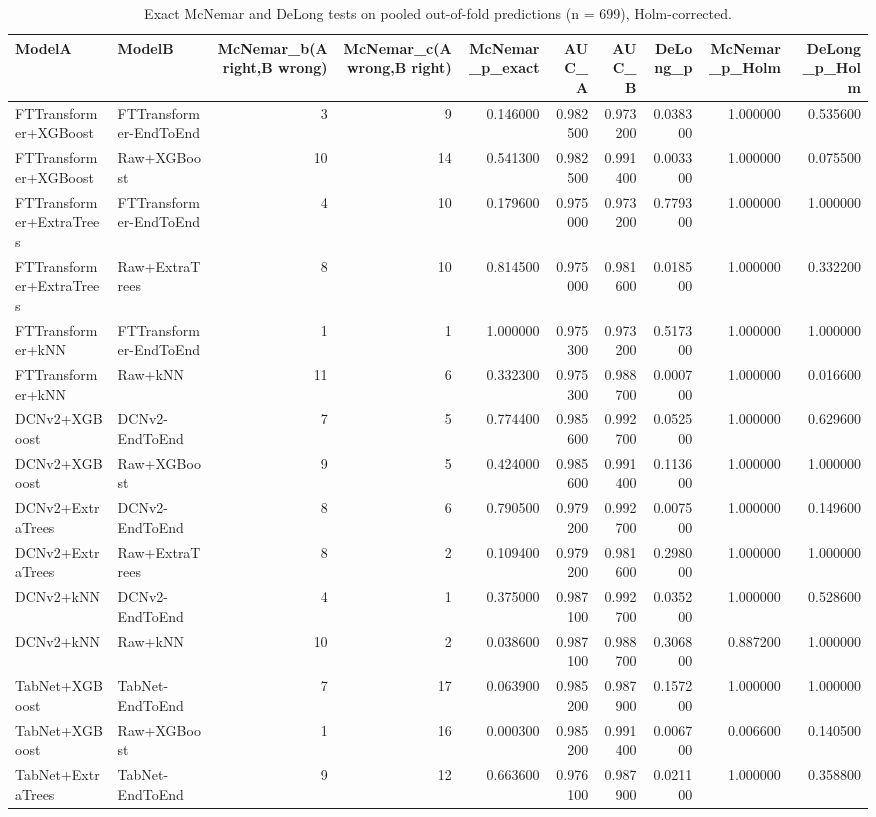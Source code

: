 \begin{table}
\caption{Exact McNemar and DeLong tests on pooled out-of-fold predictions (n = 699), Holm-corrected.}
\label{tab:stats}
\begin{tabular}{llrrrrrrrr}
\toprule
ModelA & ModelB & McNemar\_b(A right,B wrong) & McNemar\_c(A wrong,B right) & McNemar\_p\_exact & AUC\_A & AUC\_B & DeLong\_p & McNemar\_p\_Holm & DeLong\_p\_Holm \\
\midrule
FTTransformer+XGBoost & FTTransformer-EndToEnd & 3 & 9 & 0.146000 & 0.982500 & 0.973200 & 0.038300 & 1.000000 & 0.535600 \\
FTTransformer+XGBoost & Raw+XGBoost & 10 & 14 & 0.541300 & 0.982500 & 0.991400 & 0.003300 & 1.000000 & 0.075500 \\
FTTransformer+ExtraTrees & FTTransformer-EndToEnd & 4 & 10 & 0.179600 & 0.975000 & 0.973200 & 0.779300 & 1.000000 & 1.000000 \\
FTTransformer+ExtraTrees & Raw+ExtraTrees & 8 & 10 & 0.814500 & 0.975000 & 0.981600 & 0.018500 & 1.000000 & 0.332200 \\
FTTransformer+kNN & FTTransformer-EndToEnd & 1 & 1 & 1.000000 & 0.975300 & 0.973200 & 0.517300 & 1.000000 & 1.000000 \\
FTTransformer+kNN & Raw+kNN & 11 & 6 & 0.332300 & 0.975300 & 0.988700 & 0.000700 & 1.000000 & 0.016600 \\
DCNv2+XGBoost & DCNv2-EndToEnd & 7 & 5 & 0.774400 & 0.985600 & 0.992700 & 0.052500 & 1.000000 & 0.629600 \\
DCNv2+XGBoost & Raw+XGBoost & 9 & 5 & 0.424000 & 0.985600 & 0.991400 & 0.113600 & 1.000000 & 1.000000 \\
DCNv2+ExtraTrees & DCNv2-EndToEnd & 8 & 6 & 0.790500 & 0.979200 & 0.992700 & 0.007500 & 1.000000 & 0.149600 \\
DCNv2+ExtraTrees & Raw+ExtraTrees & 8 & 2 & 0.109400 & 0.979200 & 0.981600 & 0.298000 & 1.000000 & 1.000000 \\
DCNv2+kNN & DCNv2-EndToEnd & 4 & 1 & 0.375000 & 0.987100 & 0.992700 & 0.035200 & 1.000000 & 0.528600 \\
DCNv2+kNN & Raw+kNN & 10 & 2 & 0.038600 & 0.987100 & 0.988700 & 0.306800 & 0.887200 & 1.000000 \\
TabNet+XGBoost & TabNet-EndToEnd & 7 & 17 & 0.063900 & 0.985200 & 0.987900 & 0.157200 & 1.000000 & 1.000000 \\
TabNet+XGBoost & Raw+XGBoost & 1 & 16 & 0.000300 & 0.985200 & 0.991400 & 0.006700 & 0.006600 & 0.140500 \\
TabNet+ExtraTrees & TabNet-EndToEnd & 9 & 12 & 0.663600 & 0.976100 & 0.987900 & 0.021100 & 1.000000 & 0.358800 \\

\end{tabular}
\end{table}
